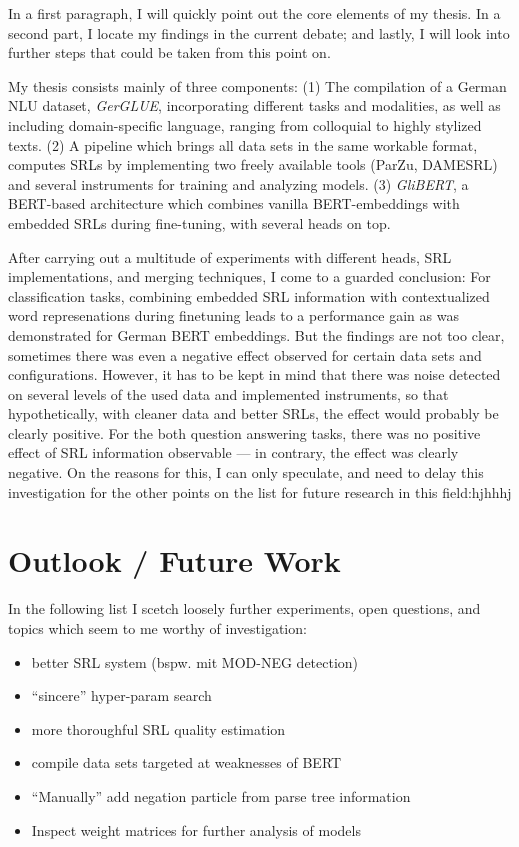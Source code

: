 \label{chap:6_conclusion}


In a first paragraph, I will quickly point out the core elements of my thesis. In a second part, I
locate my findings in the current debate; and lastly, I will look into further steps that could be
taken from this point on.

My thesis consists mainly of three components: (1) The compilation of a German NLU
dataset, \emph{GerGLUE}, incorporating different tasks and modalities, as well as
including domain-specific language, ranging from colloquial to highly stylized texts.
(2) A pipeline which brings all data sets in the same workable format, computes SRLs
by implementing two freely available tools (ParZu, DAMESRL) and several instruments
for training and analyzing models. (3) \emph{GliBERT}, a BERT-based architecture
which combines vanilla BERT-embeddings with embedded SRLs during fine-tuning, with
several heads on top.

After carrying out a multitude of experiments with different heads, SRL implementations,
and merging techniques, I come to a guarded conclusion: For classification tasks, combining
embedded SRL information with contextualized word represenations during finetuning leads to
a performance gain as was demonstrated for German BERT embeddings. But the findings are not
too clear, sometimes there was even a negative effect observed for certain data sets and
configurations. However, it has to be kept in mind that there was noise detected on several
levels of the used data and implemented instruments, so that hypothetically, with cleaner
data and better SRLs, the effect would probably be clearly positive. For the both question
answering tasks, there was no positive effect of SRL information observable --- in contrary,
the effect was clearly negative. On the reasons for this, I can only speculate, and need
to delay this investigation for the other points on the list for future research in this field:hjhhhj



\section{Outlook / Future Work}

In the following list I scetch loosely further experiments, open questions, and topics which
seem to me worthy of investigation:

\begin{itemize}
  \item better SRL system (bspw. mit MOD-NEG detection)
  \item ``sincere'' hyper-param search
  \item more thoroughful SRL quality estimation
  \item compile data sets targeted at weaknesses of BERT
  \item ``Manually'' add negation particle from parse tree information
  \item Inspect weight matrices for further analysis of models
\end{itemize}


